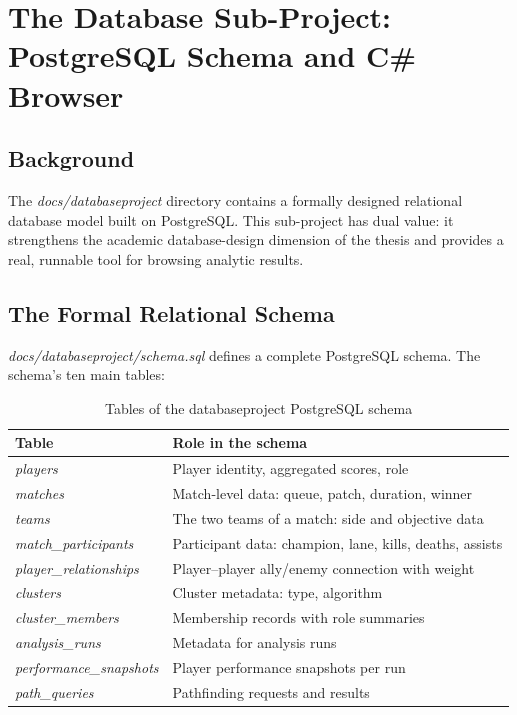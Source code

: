 \chapter{The Database Sub-Project: PostgreSQL Schema and C\# Browser}

\section{Background}

The \textit{docs/databaseproject} directory contains a formally designed relational database model built on PostgreSQL. This sub-project has dual value: it strengthens the academic database-design dimension of the thesis and provides a real, runnable tool for browsing analytic results.

\section{The Formal Relational Schema}

\textit{docs/databaseproject/schema.sql} defines a complete PostgreSQL schema. The schema's ten main tables:

\begin{table}[H]
\centering
\caption{Tables of the databaseproject PostgreSQL schema}
\begin{tabularx}{\textwidth}{|>{\raggedright\arraybackslash}p{4.5cm}|X|}
\hline
\textbf{Table} & \textbf{Role in the schema} \\
\hline
\textit{players} & Player identity, aggregated scores, role \\
\textit{matches} & Match-level data: queue, patch, duration, winner \\
\textit{teams} & The two teams of a match: side and objective data \\
\textit{match\_participants} & Participant data: champion, lane, kills, deaths, assists \\
\textit{player\_relationships} & Player--player ally/enemy connection with weight \\
\textit{clusters} & Cluster metadata: type, algorithm \\
\textit{cluster\_members} & Membership records with role summaries \\
\textit{analysis\_runs} & Metadata for analysis runs \\
\textit{performance\_snapshots} & Player performance snapshots per run \\
\textit{path\_queries} & Pathfinding requests and results \\
\hline
\end{tabularx}
\end{table}

